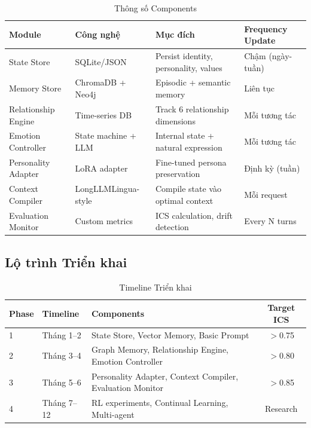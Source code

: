 \documentclass[10pt,leqno]{amsart}
\begin{document}
\begin{table}[H]
\centering
\caption{Thông số Components}
\label{tab:components}
\begin{tabular}{llll}
\toprule
\textbf{Module} & \textbf{Công nghệ} & \textbf{Mục đích} & \textbf{Frequency Update} \\
\midrule
State Store & SQLite/JSON & Persist identity, personality, values & Chậm (ngày-tuần) \\
Memory Store & ChromaDB + Neo4j & Episodic + semantic memory & Liên tục \\
Relationship Engine & Time-series DB & Track 6 relationship dimensions & Mỗi tương tác \\
Emotion Controller & State machine + LLM & Internal state + natural expression & Mỗi tương tác \\
Personality Adapter & LoRA adapter & Fine-tuned persona preservation & Định kỳ (tuần) \\
Context Compiler & LongLLMLingua-style & Compile state vào optimal context & Mỗi request \\
Evaluation Monitor & Custom metrics & ICS calculation, drift detection & Every N turns \\
\bottomrule
\end{tabular}
\end{table}

\subsection{Lộ trình Triển khai}

\begin{table}[H]
\centering
\caption{Timeline Triển khai}
\label{tab:roadmap}
\begin{tabular}{lllc}
\toprule
\textbf{Phase} & \textbf{Timeline} & \textbf{Components} & \textbf{Target ICS} \\
\midrule
1 & Tháng 1--2 & State Store, Vector Memory, Basic Prompt & $>$0.75 \\
2 & Tháng 3--4 & Graph Memory, Relationship Engine, Emotion Controller & $>$0.80 \\
3 & Tháng 5--6 & Personality Adapter, Context Compiler, Evaluation Monitor & $>$0.85 \\
4 & Tháng 7--12 & RL experiments, Continual Learning, Multi-agent & Research \\
\bottomrule
\end{tabular}
\end{table}

\end{document}
